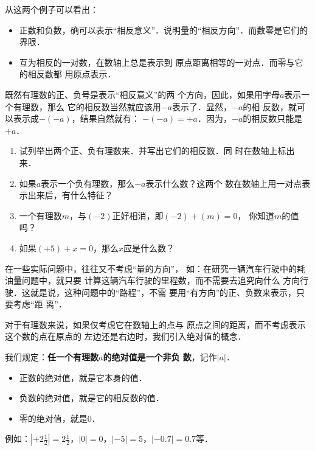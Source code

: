 从这两个例子可以看出：
\begin{blk}{}
	\begin{itemize}
		\item 正数和负数，确可以表示“相反意义”．说明量的“相反方向”．而数零是它们的界限．
		\item 互为相反的一对数，在数轴上总是表示到
		原点距离相等的一对点．而零与它的相反数都
		用原点表示．
	\end{itemize}    
\end{blk}


既然有理数的正、负号是表示“相反意义”的两
个方向，因此，如果用字母$a$表示一个有理数，那么
它的相反数当然就应该用$-a$表示了．显然，$-a$的相
反数，就可以表示成$-(- a)$，结果自然就有：
$-(-a)=+a$．因为，$-a$的相反数只能是$+a$．

\begin{ex}
	\begin{enumerate}
		\item 试列举出两个正、负有理数来．并写出它们的相反数．同
		时在数轴上标出来．
		\item 如果$a$表示一个负有理数，那么$-a$表示什么数？这两个
		数在数轴上用一对点表示出来后，有什么特征？
		\item 一个有理数$m$，与$(-2)$正好相消，即$(-2)+(m)=0$，
		你知道$m$的值吗？
		\item 如果$(+5) +x=0$，那么$x$应是什么数？
	\end{enumerate}    
\end{ex}    

在一些实际问题中，往往又不考虑“量的方向”，
如：在研究一辆汽车行驶中的耗油量问题中，就只要
计算这辆汽车行驶的里程数，而不需要去追究向什么
方向行驶．这就是说，这种问题中的“路程”，不需
要用“有方向”的正、负数来表示，只要考虑“距
离”．

对于有理数来说，如果仅考虑它在数轴上的点与
原点之间的距离，而不考虑表示这个数的点在原点的
左边还是右边时，我们引入绝对值的概念．

我们规定：\textbf{任一个有理数$a$的绝对值是一个非负
	数}，记作$|a|$．

\begin{blk}{}
	\begin{itemize}
		\item 正数的绝对值，就是它本身的值．
		\item 负数的绝对值，就是它的相反数的值．
		\item 零的绝对值，就是0．
	\end{itemize}
\end{blk}

例如：$\left|+2\frac{1}{2}\right|=2\frac{1}{2}$，$|0|=0$，$|-5|=5$，$|-0.7|=0.7$等．


